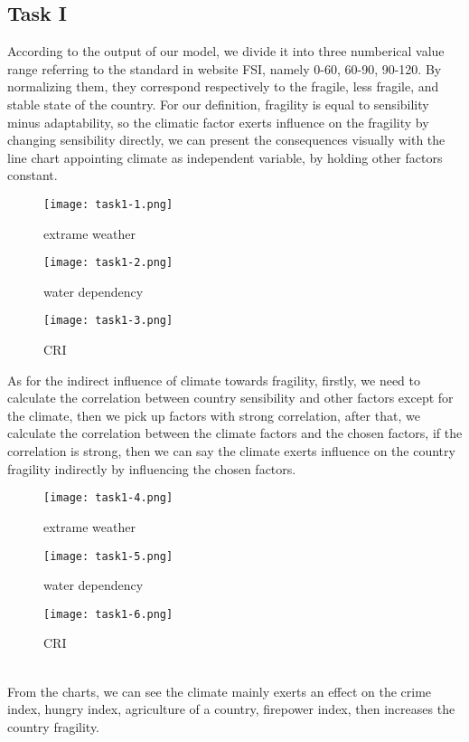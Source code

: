 \documentclass{mcmthesis}
\begin{document}
\subsection{Task I}
According to the output of our model, we divide it into 
three numberical value range referring to the standard in website 
FSI, namely 0-60, 60-90, 90-120. By normalizing them, they 
correspond respectively to the fragile, less fragile, and stable 
state of the country. For our definition, fragility is equal to 
sensibility minus adaptability, so the climatic factor exerts 
influence on the fragility by changing sensibility directly, 
we can present the consequences visually with the line chart 
appointing climate as independent variable, by holding other 
factors constant. 
\begin{figure}[h]
  \centering
  \begin{minipage}[h]{0.3\textwidth}
  \centering
  \texttt{[image: task1-1.png]}
  \caption{extrame weather}
  \end{minipage}
  \begin{minipage}[h]{0.3\textwidth}
  \centering
  \texttt{[image: task1-2.png]}
  \caption{water dependency}
  \end{minipage}    
  \begin{minipage}[h]{0.3\textwidth}
  \centering
  \texttt{[image: task1-3.png]}
  \caption{CRI}
  \end{minipage}  
\end{figure}
As for the indirect influence of climate towards 
fragility, firstly, we need to calculate the correlation between 
country sensibility and other factors except for the climate, then 
we pick up factors with strong correlation, after that, we 
calculate the correlation between the climate factors and the 
chosen factors, if the correlation is strong, then we can say 
the climate exerts influence on the country fragility indirectly 
by influencing the chosen factors.
\begin{figure}[h]
  \centering
  \begin{minipage}[h]{0.3\textwidth}
  \centering
  \texttt{[image: task1-4.png]}
  \caption{extrame weather}
  \end{minipage}
  \begin{minipage}[h]{0.3\textwidth}
  \centering
  \texttt{[image: task1-5.png]}
  \caption{water dependency}
  \end{minipage}    
  \begin{minipage}[h]{0.3\textwidth}
  \centering
  \texttt{[image: task1-6.png]}
  \caption{CRI}
  \end{minipage}  
\end{figure}\\
From the charts, we can see the climate mainly exerts 
an effect on the crime index, hungry index, agriculture of 
a country, firepower index, then increases the 
country fragility.
\end{document}
